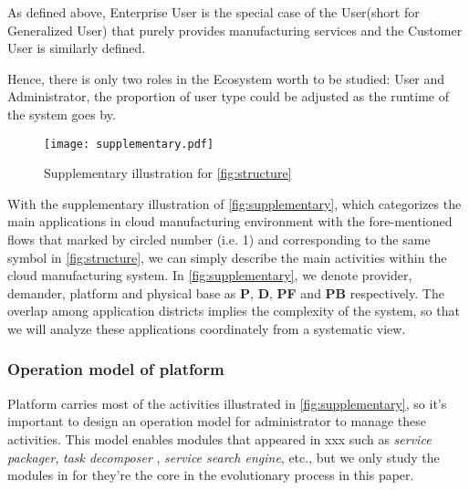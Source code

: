 As defined above, Enterprise User is the special case of the User(short for Generalized User) that purely provides manufacturing services and the Customer User is similarly defined.

Hence, there is only two roles in the Ecosystem worth to be studied: User and Administrator, the proportion of user type could be adjusted as the runtime of the system goes by.

\begin{figure}[htbp]
\centering
\texttt{[image: supplementary.pdf]}
\caption{Supplementary illustration for \autoref{fig:structure}}
\label{fig:supplementary}
\end{figure}

With the supplementary illustration of \autoref{fig:supplementary}, which categorizes the main applications in cloud manufacturing environment with the fore-mentioned flows that marked by circled number (i.e. \textcircled{\small{1}}) and corresponding to the same symbol in \autoref{fig:structure}, we can simply describe the main activities within the cloud manufacturing system. In \autoref{fig:supplementary}, we denote provider, demander, platform and physical base as \textbf{P}, \textbf{D}, \textbf{PF} and \textbf{PB} respectively. The overlap among application districts implies the complexity of the system, so that we will analyze these applications coordinately from a systematic view.



\subsubsection{Operation model of platform}
\label{ssub:operation_model_of_platform}
Platform carries most of the activities illustrated in \autoref{fig:supplementary}, so it's important to design an operation model for administrator to manage these activities. This model enables modules that appeared in xxx such as \textit{service packager}, \textit{task decomposer} , \textit{service search engine}, etc., but we only study the modules in for they're the core in the evolutionary process in this paper.

